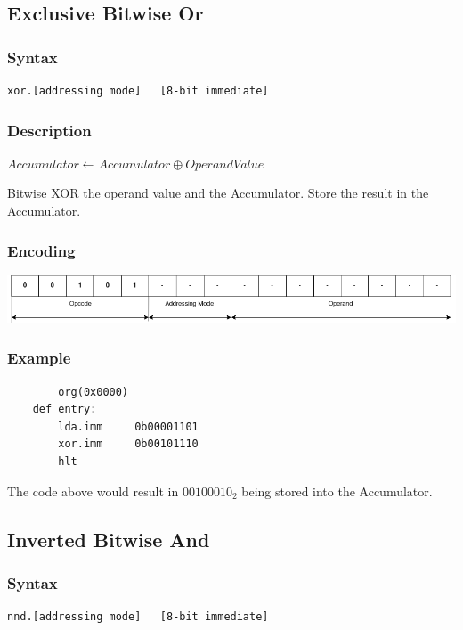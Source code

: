 \pagebreak
\subsection{Exclusive Bitwise Or}\label{subsec:xor}
    \subsubsection{Syntax}
    \begin{verbatim}xor.[addressing mode]   [8-bit immediate]\end{verbatim}

    \subsubsection{Description}
    $Accumulator \leftarrow Accumulator \oplus OperandValue$
    \par Bitwise XOR the operand value and the Accumulator.
    Store the result in the Accumulator.

    \subsubsection{Encoding}
    \begin{center}
        \includegraphics[scale=0.40]{img/Andromeda-XOR.drawio}
    \end{center}

    \subsubsection{Example}
    \begin{verbatim}
        org(0x0000)
    def entry:
        lda.imm     0b00001101
        xor.imm     0b00101110
        hlt
    \end{verbatim}
    \par The code above would result in $00100010_{2}$ being stored into the Accumulator.

\pagebreak
\subsection{Inverted Bitwise And}\label{subsec:nand}
    \subsubsection{Syntax}
    \begin{verbatim}nnd.[addressing mode]   [8-bit immediate] \end{verbatim}

